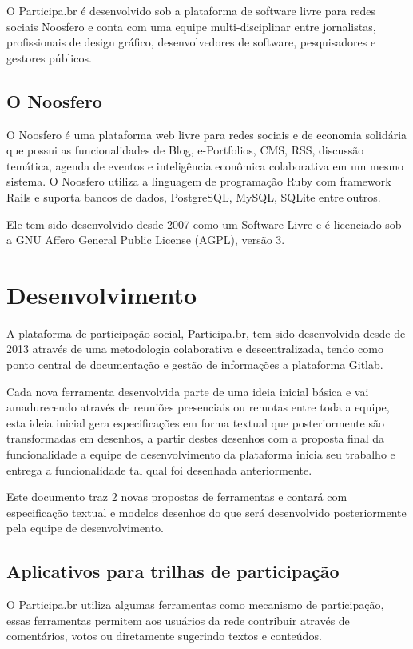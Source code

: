 \documentclass[12pt]{article}
\begin{document}
O Participa.br é desenvolvido sob a plataforma de software livre para redes
sociais Noosfero e conta com uma equipe multi-disciplinar entre jornalistas,
profissionais de design gráfico, desenvolvedores de software, pesquisadores e
gestores públicos.

\subsection{O Noosfero}

O Noosfero é uma plataforma web livre para redes sociais e de economia
solidária que possui as funcionalidades de Blog, e-Portfolios, CMS, RSS,
discussão temática, agenda de eventos e inteligência econômica colaborativa
em um mesmo sistema. O Noosfero utiliza a linguagem de programação Ruby com
framework Rails e suporta bancos de dados, PostgreSQL, MySQL, SQLite entre
outros.

Ele tem sido desenvolvido desde 2007 como um Software Livre e é licenciado sob
a GNU Affero General Public License (AGPL), versão 3.

\section{Desenvolvimento}

A plataforma de participação social, Participa.br, tem sido desenvolvida desde
de 2013 através de uma metodologia colaborativa e descentralizada, tendo como
ponto central de documentação e gestão de informações a plataforma
Gitlab\cite{gitlab}.

Cada nova ferramenta desenvolvida parte de uma ideia inicial básica e vai
amadurecendo através de reuniões presenciais ou remotas entre toda a equipe,
esta ideia inicial gera especificações em forma textual que posteriormente são
transformadas em desenhos, a partir destes desenhos com a proposta final da
funcionalidade a equipe de desenvolvimento da plataforma inicia seu trabalho e
entrega a funcionalidade tal qual foi desenhada anteriormente.

Este documento traz 2 novas propostas de ferramentas e contará com
especificação textual e modelos desenhos do que será desenvolvido
posteriormente pela equipe de desenvolvimento.

\subsection{Aplicativos para trilhas de participação}
 
O Participa.br utiliza algumas ferramentas como mecanismo de participação,
essas ferramentas permitem aos usuários da rede contribuir através de
comentários, votos ou diretamente sugerindo textos e conteúdos.
\end{document}
